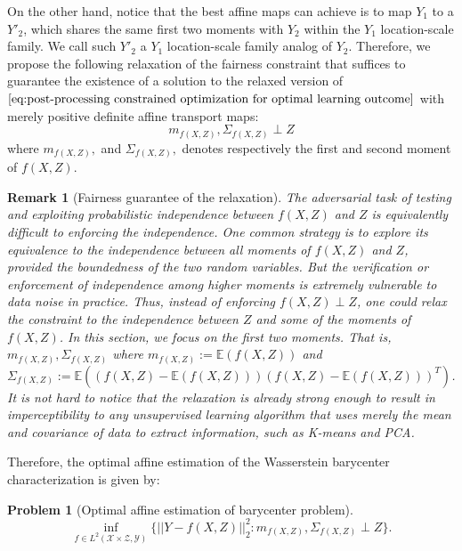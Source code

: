 \documentclass[twoside,11pt]{article}
\newtheorem{prob}{Problem}
\newtheorem{rema}{Remark}[section]{\bfseries}{\itshape}
\begin{document}
On the other hand, notice that the best affine maps can achieve is to map $Y_1$ to a $Y'_2$, which shares the same first two moments with $Y_2$ within the $Y_1$ location-scale family. We call such $Y'_2$ a $Y_1$ location-scale family analog of $Y_2$. Therefore, we propose the following relaxation of the fairness constraint that suffices to guarantee the existence of a solution to the relaxed version of $\eqref{eq:post-processing constrained optimization for optimal learning outcome}$ with merely positive definite affine transport maps:
\begin{equation}
m_{f(X,Z)}, \Sigma_{f(X,Z)} \perp Z
\end{equation}
where $m_{f(X,Z)},$ and $\Sigma_{f(X,Z)},$ denotes respectively the first and second moment of $f(X,Z)$.

\begin{rema}[Fairness guarantee of the relaxation]\label{r:Fairness Guarantee of the Relaxation}
The adversarial task of testing and exploiting probabilistic independence between $f(X,Z)$ and $Z$ is equivalently difficult to enforcing the independence. One common strategy is to explore its equivalence to the independence between all moments of $f(X,Z)$ and $Z$, provided the boundedness of the two random variables. But the verification or enforcement of independence among higher moments is extremely vulnerable to data noise in practice. Thus, instead of enforcing $f(X,Z) \perp Z$, one could relax the constraint to the independence between $Z$ and some of the moments of $f(X,Z)$. In this section, we focus on the first two moments. That is, $m_{f(X,Z)}, \Sigma_{f(X,Z)}$ where $m_{f(X,Z)} := \mathbb{E}(f(X,Z))$ and $\Sigma_{f(X,Z)} := \mathbb{E}((f(X,Z) - \mathbb{E}(f(X,Z)))(f(X,Z) - \mathbb{E}(f(X,Z)))^T)$. It is not hard to notice that the relaxation is already strong enough to result in imperceptibility to any unsupervised learning algorithm that uses merely the mean and covariance of data to extract information, such as K-means and PCA.
\end{rema}

Therefore, the optimal affine estimation of the Wasserstein barycenter characterization is given by:
\begin{prob}[Optimal affine estimation of barycenter problem]\label{prob:optimal affine estimation of barycenter problem}
\begin{equation} \label{eq:optimal affine estimation of barycenter problem}
\inf_{f \in L^2(\mathcal{X} \times \mathcal{Z},\mathcal{Y})} \{||Y - f(X,Z)||_2^2: m_{f(X,Z)}, \Sigma_{f(X,Z)} \perp Z\}.
\end{equation}
\end{prob}
\end{document}
